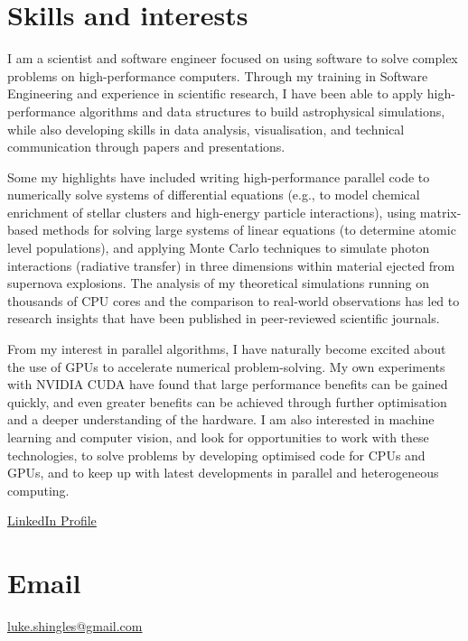 \documentclass[11pt]{res} %
\begin{document}

\begin{resume}

\section{Skills and interests}
  I am a scientist and software engineer focused on using software to solve complex problems on high-performance computers. Through my training in Software Engineering and experience in scientific research, I have been able to apply high-performance algorithms and data structures to build astrophysical simulations, while also developing skills in data analysis, visualisation, and technical communication through papers and presentations.

  Some my highlights have included writing high-performance parallel code to numerically solve systems of differential equations (e.g., to model chemical enrichment of stellar clusters and high-energy particle interactions), using matrix-based methods for solving large systems of linear equations (to determine atomic level populations), and applying Monte Carlo techniques to simulate photon interactions (radiative transfer) in three dimensions within material ejected from supernova explosions. The analysis of my theoretical simulations running on thousands of CPU cores and the comparison to real-world observations has led to research insights that have been published in peer-reviewed scientific journals.

  From my interest in parallel algorithms, I have naturally become excited about the use of GPUs to accelerate numerical problem-solving. My own experiments with NVIDIA CUDA have found that large performance benefits can be gained quickly, and even greater benefits can be achieved through further optimisation and a deeper understanding of the hardware. I am also interested in machine learning and computer vision, and look for opportunities to work with these technologies, to solve problems by developing optimised code for CPUs and GPUs, and to keep up with latest developments in parallel and heterogeneous computing.

  \href{https://www.linkedin.com/in/lukeshingles/}{LinkedIn Profile}

\section{Email}
  \href{mailto:luke.shingles@gmail.com}{luke.shingles@gmail.com}


\end{resume}
\end{document}
